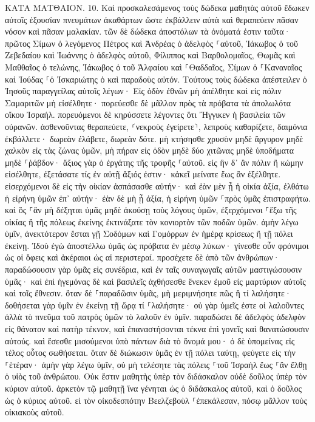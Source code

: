 \documentclass[twoside, 9pt]{extreport}
\begin{document}
ΚΑΤΑ ΜΑΤΘΑΙΟΝ.
10.
Καὶ προσκαλεσάμενος τοὺς δώδεκα μαθητὰς αὐτοῦ ἔδωκεν αὐτοῖς ἐξουσίαν πνευμάτων ἀκαθάρτων ὥστε ἐκβάλλειν αὐτὰ καὶ θεραπεύειν πᾶσαν νόσον καὶ πᾶσαν μαλακίαν. 
τῶν δὲ δώδεκα ἀποστόλων τὰ ὀνόματά ἐστιν ταῦτα· πρῶτος Σίμων ὁ λεγόμενος Πέτρος καὶ Ἀνδρέας ὁ ἀδελφὸς ⸀αὐτοῦ, Ἰάκωβος ὁ τοῦ Ζεβεδαίου καὶ Ἰωάννης ὁ ἀδελφὸς αὐτοῦ, 
Φίλιππος καὶ Βαρθολομαῖος, Θωμᾶς καὶ Μαθθαῖος ὁ τελώνης, Ἰάκωβος ὁ τοῦ Ἁλφαίου καὶ ⸀Θαδδαῖος, 
Σίμων ὁ ⸀Καναναῖος καὶ Ἰούδας ⸀ὁ Ἰσκαριώτης ὁ καὶ παραδοὺς αὐτόν. 
Τούτους τοὺς δώδεκα ἀπέστειλεν ὁ Ἰησοῦς παραγγείλας αὐτοῖς λέγων· Εἰς ὁδὸν ἐθνῶν μὴ ἀπέλθητε καὶ εἰς πόλιν Σαμαριτῶν μὴ εἰσέλθητε· 
πορεύεσθε δὲ μᾶλλον πρὸς τὰ πρόβατα τὰ ἀπολωλότα οἴκου Ἰσραήλ. 
πορευόμενοι δὲ κηρύσσετε λέγοντες ὅτι Ἤγγικεν ἡ βασιλεία τῶν οὐρανῶν. 
ἀσθενοῦντας θεραπεύετε, ⸂νεκροὺς ἐγείρετε⸃, λεπροὺς καθαρίζετε, δαιμόνια ἐκβάλλετε· δωρεὰν ἐλάβετε, δωρεὰν δότε. 
μὴ κτήσησθε χρυσὸν μηδὲ ἄργυρον μηδὲ χαλκὸν εἰς τὰς ζώνας ὑμῶν, 
μὴ πήραν εἰς ὁδὸν μηδὲ δύο χιτῶνας μηδὲ ὑποδήματα μηδὲ ⸀ῥάβδον· ἄξιος γὰρ ὁ ἐργάτης τῆς τροφῆς ⸀αὐτοῦ. 
εἰς ἣν δ᾽ ἂν πόλιν ἢ κώμην εἰσέλθητε, ἐξετάσατε τίς ἐν αὐτῇ ἄξιός ἐστιν· κἀκεῖ μείνατε ἕως ἂν ἐξέλθητε. 
εἰσερχόμενοι δὲ εἰς τὴν οἰκίαν ἀσπάσασθε αὐτήν· 
καὶ ἐὰν μὲν ᾖ ἡ οἰκία ἀξία, ἐλθάτω ἡ εἰρήνη ὑμῶν ἐπ᾽ αὐτήν· ἐὰν δὲ μὴ ᾖ ἀξία, ἡ εἰρήνη ὑμῶν ⸀πρὸς ὑμᾶς ἐπιστραφήτω. 
καὶ ὃς ⸀ἂν μὴ δέξηται ὑμᾶς μηδὲ ἀκούσῃ τοὺς λόγους ὑμῶν, ἐξερχόμενοι ⸀ἔξω τῆς οἰκίας ἢ τῆς πόλεως ἐκείνης ἐκτινάξατε τὸν κονιορτὸν τῶν ποδῶν ὑμῶν. 
ἀμὴν λέγω ὑμῖν, ἀνεκτότερον ἔσται γῇ Σοδόμων καὶ Γομόρρων ἐν ἡμέρᾳ κρίσεως ἢ τῇ πόλει ἐκείνῃ. 
Ἰδοὺ ἐγὼ ἀποστέλλω ὑμᾶς ὡς πρόβατα ἐν μέσῳ λύκων· γίνεσθε οὖν φρόνιμοι ὡς οἱ ὄφεις καὶ ἀκέραιοι ὡς αἱ περιστεραί. 
προσέχετε δὲ ἀπὸ τῶν ἀνθρώπων· παραδώσουσιν γὰρ ὑμᾶς εἰς συνέδρια, καὶ ἐν ταῖς συναγωγαῖς αὐτῶν μαστιγώσουσιν ὑμᾶς· 
καὶ ἐπὶ ἡγεμόνας δὲ καὶ βασιλεῖς ἀχθήσεσθε ἕνεκεν ἐμοῦ εἰς μαρτύριον αὐτοῖς καὶ τοῖς ἔθνεσιν. 
ὅταν δὲ ⸀παραδῶσιν ὑμᾶς, μὴ μεριμνήσητε πῶς ἢ τί λαλήσητε· δοθήσεται γὰρ ὑμῖν ἐν ἐκείνῃ τῇ ὥρᾳ τί ⸀λαλήσητε· 
οὐ γὰρ ὑμεῖς ἐστε οἱ λαλοῦντες ἀλλὰ τὸ πνεῦμα τοῦ πατρὸς ὑμῶν τὸ λαλοῦν ἐν ὑμῖν. 
παραδώσει δὲ ἀδελφὸς ἀδελφὸν εἰς θάνατον καὶ πατὴρ τέκνον, καὶ ἐπαναστήσονται τέκνα ἐπὶ γονεῖς καὶ θανατώσουσιν αὐτούς. 
καὶ ἔσεσθε μισούμενοι ὑπὸ πάντων διὰ τὸ ὄνομά μου· ὁ δὲ ὑπομείνας εἰς τέλος οὗτος σωθήσεται. 
ὅταν δὲ διώκωσιν ὑμᾶς ἐν τῇ πόλει ταύτῃ, φεύγετε εἰς τὴν ⸀ἑτέραν· ἀμὴν γὰρ λέγω ὑμῖν, οὐ μὴ τελέσητε τὰς πόλεις ⸀τοῦ Ἰσραὴλ ἕως ⸀ἂν ἔλθῃ ὁ υἱὸς τοῦ ἀνθρώπου. 
Οὐκ ἔστιν μαθητὴς ὑπὲρ τὸν διδάσκαλον οὐδὲ δοῦλος ὑπὲρ τὸν κύριον αὐτοῦ. 
ἀρκετὸν τῷ μαθητῇ ἵνα γένηται ὡς ὁ διδάσκαλος αὐτοῦ, καὶ ὁ δοῦλος ὡς ὁ κύριος αὐτοῦ. εἰ τὸν οἰκοδεσπότην Βεελζεβοὺλ ⸀ἐπεκάλεσαν, πόσῳ μᾶλλον τοὺς οἰκιακοὺς αὐτοῦ. 
\end{document}
